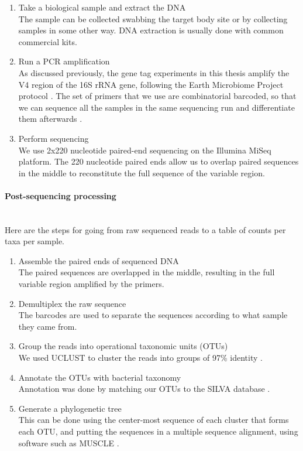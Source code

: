 \begin{enumerate}
\item Take a biological sample and extract the DNA\\
The sample can be collected swabbing the target body site or by collecting samples in some other way. DNA extraction is usually done with common commercial kits.

\item Run a PCR amplification\\
As discussed previously, the gene tag experiments in this thesis amplify the V4 region of the 16S rRNA gene, following the Earth Microbiome Project protocol \cite{caporaso2012ultra}. The set of primers that we use are combinatorial barcoded, so that we can sequence all the samples in the same sequencing run and differentiate them afterwards \cite{gloor2010microbiome}.

\item Perform sequencing\\
We use 2x220 nucleotide paired-end sequencing on the Illumina MiSeq platform. The 220 nucleotide paired ends allow us to overlap paired sequences in the middle to reconstitute the full sequence of the variable region.
\end{enumerate}

\paragraph{Post-sequencing processing}\mbox{}\\
Here are the steps for going from raw sequenced reads to a table of counts per taxa per sample.
\begin{enumerate}
\item Assemble the paired ends of sequenced DNA\\
The paired sequences are overlapped in the middle, resulting in the full variable region amplified by the primers.

\item Demultiplex the raw sequence\\
The barcodes are used to separate the sequences according to what sample they came from.

\item Group the reads into operational taxonomic units (OTUs)\\
We used UCLUST to cluster the reads into groups of 97\% identity \cite{edgar2010search}.

\item Annotate the OTUs with bacterial taxonomy\\
Annotation was done by  matching our OTUs to the SILVA database \cite{quast2013silva}.

\item Generate a phylogenetic tree\\
This can be done using the center-most sequence of each cluster that forms each OTU, and putting the sequences in a multiple sequence alignment, using software such as MUSCLE \cite{edgar2004muscle}.
\end{enumerate}

